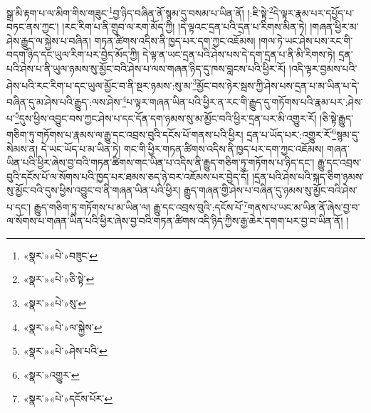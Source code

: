 སྒྲ་མི་རྟག་པ་ལ་མིག་གིས་གཟུང་\footnote{«སྣར་»«པེ་»བཟུང་}བྱ་ཉིད་བཞིན་ནོ་སྙམ་དུ་བསམ་པ་ཡིན་ནོ། །:ཇི་སྟེ་\footnote{«སྣར་»«པེ་»ཅི་སྟེ་}དེ་ལྟར་རྣམ་པར་དཔྱོད་པ་བཏང་ནས་ཀྱང་། །རང་རིག་པ་ནི་གྲུབ་ལ་རག་མོད་ཀྱི། །དེ་ལྟའང་དྲན་པའི་དྲན་པ་རིགས་མིན་ཏེ། །གཞན་ཕྱིར་མ་ཤེས་རྒྱུད་ལ་སྐྱེས་པ་བཞིན། གཏན་ཚིགས་འདིས་ནི་ཁྱད་པར་དག་ཀྱང་འཇོམས། །གལ་ཏེ་ཡང་ཤེས་པས་རང་གི་བདག་ཉིད་དང་ཡུལ་རིག་པར་བྱེད་མོད་ཀྱི། དེ་ལྟ་ན་ཡང་དྲན་པའི་ཤེས་པས་དེ་དག་དྲན་པ་ནི་མི་རིགས་ཏེ། དྲན་པའི་ཤེས་པ་ནི་ཡུལ་ཉམས་སུ་མྱོང་བའི་ཤེས་པ་ལས་གཞན་ཉིད་དུ་ཁས་བླངས་པའི་ཕྱིར་རོ། །འདི་ལྟར་བྱམས་པའི་ཤེས་པའི་རང་རིག་པ་དང་ཡུལ་མྱོང་བ་ནི་སྔར་ཉམས་:སུ་མ་\footnote{«སྣར་»«པེ་»སུ་}མྱོང་བས་ཉེར་སྦས་ཀྱི་ཤེས་པས་དྲན་པ་མ་ཡིན་པ་དེ་བཞིན་དུ་མ་ཤེས་པའི་རྒྱུད་:ལས་ཤེས་\footnote{«སྣར་»«པེ་»ལ་སྐྱེས་}པ་ལྟར་གཞན་ཡིན་པའི་ཕྱིར་ན་རང་གི་རྒྱུད་དུ་གཏོགས་པའི་རྣམ་པར་:ཤེས་པ་\footnote{«སྣར་»«པེ་»ཤེས་པའི་}དུས་ཕྱིས་འབྱུང་བས་ཀྱང་ཤེས་པ་དང་དོན་དག་ཉམས་སུ་མ་མྱོང་བའི་ཕྱིར་དྲན་པར་མི་འགྱུར་རོ། །ཅི་སྟེ་རྒྱུད་གཅིག་ཏུ་གཏོགས་པ་རྣམས་ལ་རྒྱུ་དང་འབྲས་བུའི་དངོས་པོ་གནས་པའི་ཕྱིར། དྲན་པ་ཡོད་པར་:འགྱུར་རོ་\footnote{«སྣར་»འགྱུར་}སྙམ་དུ་སེམས་ན། དེ་ཡང་ཡོད་པ་མ་ཡིན་ཏེ། གང་གི་ཕྱིར་གཏན་ཚིགས་འདིས་ནི་ཁྱད་པར་དག་ཀྱང་འཇོམས། གཞན་ཡིན་པའི་ཕྱིར་ཞེས་བྱ་བའི་གཏན་ཚིགས་གང་ཡིན་པ་འདིས་ནི་རྒྱུད་གཅིག་ཏུ་གཏོགས་པ་ཉིད་དང་། རྒྱུ་དང་འབྲས་བུའི་དངོས་པོ་ལ་སོགས་པའི་ཁྱད་པར་ཐམས་ཅད་ཉེ་བར་འཇོམས་པར་བྱེད་དོ། །དྲན་པའི་ཤེས་པའི་སྐད་ཅིག་ཉམས་སུ་མྱོང་བའི་དུས་ཕྱིས་འབྱུང་བ་ནི་གཞན་ཡིན་པའི་ཕྱིར། རྒྱུད་གཞན་གྱི་ཤེས་པ་བཞིན་དུ་ཉམས་སུ་མྱོང་བའི་ཤེས་པ་དང་། རྒྱུད་གཅིག་ཏུ་གཏོགས་པ་མ་ཡིན་ལ། རྒྱུ་དང་འབྲས་བུའི་:དངོས་པོ་\footnote{«སྣར་»«པེ་»དངོས་པོར་}གནས་པ་ཡང་མ་ཡིན་ནོ་ཞེས་བྱ་བ་ལ་སོགས་པ་གཞན་ཡིན་པའི་ཕྱིར་ཞེས་བྱ་བའི་གཏན་ཚིགས་འདི་ཉིད་ཀྱིས་རྒྱ་ཆེར་དགག་པར་བྱ་བ་ཡིན་ནོ། །
